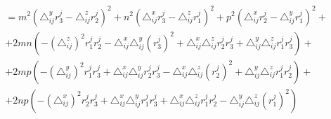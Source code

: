 $$\begin{gathered}
	= m^2 \left( \triangle_{ij}^y r_3^j - \triangle_{ij}^z r_2^j \right)^2 
	+ n^2 \left( \triangle_{ij}^x r_3^j - \triangle_{ij}^z r_1^j \right)^2
	+ p^2 \left( \triangle_{ij}^x r_2^j - \triangle_{ij}^y r_1^j \right)^2 + \\
	+ 2 m n \left( - \left( \triangle_{ij}^z \right)^2 r_1^j r_2^j - \triangle_{ij}^x \triangle_{ij}^y (r_3^j)^2 + \triangle_{ij}^x  \triangle_{ij}^z r_2^j r_3^j + \triangle_{ij}^y  \triangle_{ij}^z r_1^j r_3^j \right) + \\
	+ 2 m p \left( - \left( \triangle_{ij}^y\right)^2 r_1^j r_3^j +  \triangle_{ij}^x \triangle_{ij}^y r_2^j r_3^j -  \triangle_{ij}^x  \triangle_{ij}^z (r_2^j)^2 +  \triangle_{ij}^y  \triangle_{ij}^z r_1^j r_2^j \right) + \\
	+ 2 n p \left( - \left(\triangle_{ij}^x\right)^2 r_2^j r_3^j +  \triangle_{ij}^x \triangle_{ij}^y r_1^j r_3^j +  \triangle_{ij}^x  \triangle_{ij}^z r_1^j r_2^j -  \triangle_{ij}^y  \triangle_{ij}^z (r_1^j)^2 \right)
\end{gathered}$$

